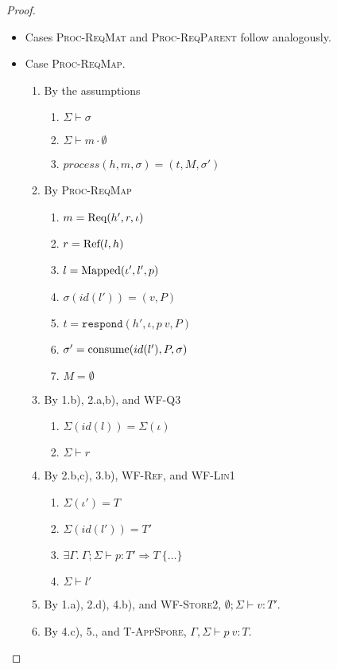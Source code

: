 \begin{proof}
\begin{itemize}
\item Cases \textsc{Proc-ReqMat} and \textsc{Proc-ReqParent} follow analogously.

\item Case \textsc{Proc-ReqMap}.
\begin{enumerate}
\item By the assumptions
  \begin{enumerate}[label=(\alph*)]
  \item $\Sigma \vdash \sigma$
  \item $\Sigma \vdash m \cdot \emptyset$
  \item $process(h, m, \sigma) = (t, M, \sigma')$
  \end{enumerate}
\item By \textsc{Proc-ReqMap}
  \begin{enumerate}[label=(\alph*)]
  \item $m = {\textrm{Req}(h', r, \iota)}$
  \item $r = {\textrm{Ref}(l, h)}$
  \item $l = {\textrm{Mapped}(\iota', l', p)}$
  \item $\sigma(id(l')) = (v, P)$
  \item $t = \texttt{respond}(h', \iota, p~v, P)$
  \item $\sigma' = {\textrm{consume}(id(l'), P, \sigma)}$
  \item $M = \emptyset$
  \end{enumerate}
\item By 1.b), 2.a,b), and \textsc{WF-Q3}
  \begin{enumerate}[label=(\alph*)]
  \item $\Sigma(id(l)) = \Sigma(\iota)$
  \item $\Sigma \vdash r$
  \end{enumerate}
\item By 2.b,c), 3.b), \textsc{WF-Ref}, and \textsc{WF-Lin1}
  \begin{enumerate}[label=(\alph*)]
  \item $\Sigma(\iota') = T$
  \item $\Sigma(id(l')) = T'$
  \item $\exists \Gamma.~\Gamma ; \Sigma \vdash p : T' \Rightarrow T~\{\ldots\}$
  \item $\Sigma \vdash l'$
  \end{enumerate}
\item By 1.a), 2.d), 4.b), and \textsc{WF-Store2}, $\emptyset ; \Sigma \vdash v : T'$.
\item By 4.c), 5., and \textsc{T-AppSpore}, $\Gamma, \Sigma \vdash p~v : T$.

\end{enumerate}
\end{itemize}
\end{proof}
